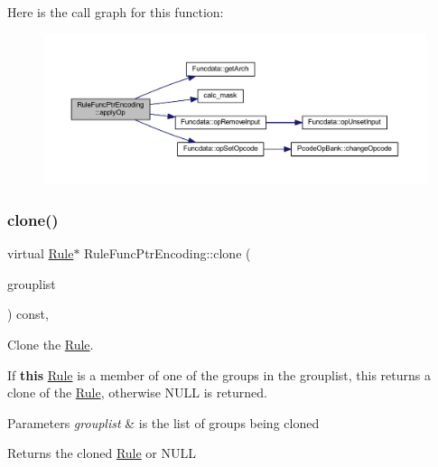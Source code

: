 Here is the call graph for this function\+:
\nopagebreak
\begin{figure}[H]
\begin{center}
\leavevmode
\includegraphics[width=350pt]{class_rule_func_ptr_encoding_ab4cf320ff9f365e41dde30a21dc7a277_cgraph}
\end{center}
\end{figure}
\mbox{\label{class_rule_func_ptr_encoding_a6738c42c8cf1be1152c573c815206876}} 
\subsubsection{\texorpdfstring{clone()}{clone()}}
{\footnotesize\ttfamily virtual \mbox{\hyperlink{class_rule}{Rule}}$\ast$ Rule\+Func\+Ptr\+Encoding\+::clone (\begin{DoxyParamCaption}\item[{const \mbox{\hyperlink{class_action_group_list}{Action\+Group\+List}} \&}]{grouplist }\end{DoxyParamCaption}) const\hspace{0.3cm}{\ttfamily [inline]}, {\ttfamily [virtual]}}



Clone the \mbox{\hyperlink{class_rule}{Rule}}. 

If {\bfseries{this}} \mbox{\hyperlink{class_rule}{Rule}} is a member of one of the groups in the grouplist, this returns a clone of the \mbox{\hyperlink{class_rule}{Rule}}, otherwise N\+U\+LL is returned. 
\begin{DoxyParams}{Parameters}
{\em grouplist} & is the list of groups being cloned \\
\hline
\end{DoxyParams}
\begin{DoxyReturn}{Returns}
the cloned \mbox{\hyperlink{class_rule}{Rule}} or N\+U\+LL 
\end{DoxyReturn}



